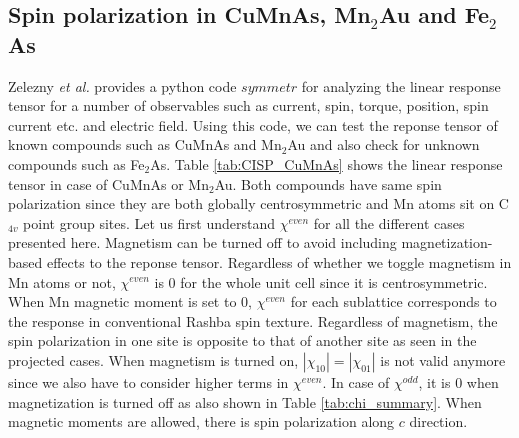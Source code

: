 \documentclass[letterpaper,10pt,doublespacing,edeposit]{uiucthesis2020}
\begin{document}
\begin{mainmatter}
\section{Spin polarization in CuMnAs, Mn$_2$Au and Fe$_2$As}


Zelezny \emph{et al.} \cite{Zelezny2017} provides a python code $symmetr$ for analyzing the linear response tensor for a number of observables such as current, spin, torque, position, spin current etc. and electric field. Using this code, we can test the reponse tensor of known compounds such as CuMnAs and Mn$_2$Au and also check for unknown compounds such as Fe$_2$As. Table \ref{tab:CISP_CuMnAs} shows the linear response tensor in case of CuMnAs or Mn$_2$Au. Both compounds have same spin polarization since they are both globally centrosymmetric and Mn atoms sit on C$_{4v}$ point group sites. Let us first understand $\chi^{even}$ for all the different cases presented here. Magnetism can be turned off to avoid including magnetization-based effects to the reponse tensor. Regardless of whether we toggle magnetism in Mn atoms or not, $\chi^{even}$ is 0 for the whole unit cell since it is centrosymmetric. When Mn magnetic moment is set to 0, $\chi^{even}$ for each sublattice corresponds to the response in conventional Rashba spin texture. Regardless of magnetism, the spin polarization in one site is opposite to that of another site as seen in the projected cases. When magnetism is turned on, $|\chi_{10}| = |\chi_{01}|$ is not valid anymore since we also have to consider higher terms in $\chi^{even}$. In case of $\chi^{odd}$, it is 0 when magnetization is turned off as also shown in Table \ref{tab:chi_summary}. When magnetic moments are allowed, there is spin polarization along $c$ direction.


\end{mainmatter}
\end{document}
